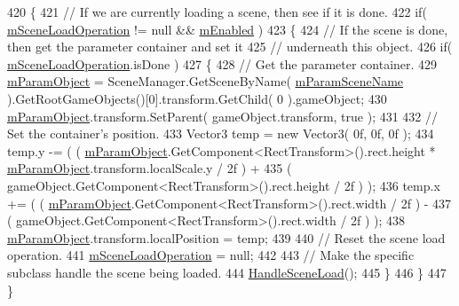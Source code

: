 \begin{DoxyCode}
420         \{
421             \textcolor{comment}{// If we are currently loading a scene, then see if it is done.}
422             \textcolor{keywordflow}{if}( \hyperlink{class_a_t_i_1_1_audio_effect_handler_a64e2617a1b7c1e6f4631a6aee98fbf3e}{mSceneLoadOperation} != null && \hyperlink{class_a_t_i_1_1_audio_effect_handler_a378c463b827ad6e41d09a4ec2caff351}{mEnabled} )
423             \{
424                 \textcolor{comment}{// If the scene is done, then get the parameter container and set it }
425                 \textcolor{comment}{// underneath this object.}
426                 \textcolor{keywordflow}{if}( \hyperlink{class_a_t_i_1_1_audio_effect_handler_a64e2617a1b7c1e6f4631a6aee98fbf3e}{mSceneLoadOperation}.isDone )
427                 \{
428                     \textcolor{comment}{// Get the parameter container.}
429                     \hyperlink{class_a_t_i_1_1_audio_effect_handler_a02ca13686cb3fc7bf152051ec881b0ed}{mParamObject} = SceneManager.GetSceneByName( 
      \hyperlink{class_a_t_i_1_1_audio_effect_handler_a674c38f29ef923e6c9487c2dc991a8b6}{mParamSceneName} ).GetRootGameObjects()[0].transform.GetChild( 0 ).gameObject;
430                     \hyperlink{class_a_t_i_1_1_audio_effect_handler_a02ca13686cb3fc7bf152051ec881b0ed}{mParamObject}.transform.SetParent( gameObject.transform, \textcolor{keyword}{true} );
431 
432                     \textcolor{comment}{// Set the container's position.}
433                     Vector3 temp = \textcolor{keyword}{new} Vector3( 0f, 0f, 0f );
434                     temp.y -= ( ( \hyperlink{class_a_t_i_1_1_audio_effect_handler_a02ca13686cb3fc7bf152051ec881b0ed}{mParamObject}.GetComponent<RectTransform>().rect.height * 
      \hyperlink{class_a_t_i_1_1_audio_effect_handler_a02ca13686cb3fc7bf152051ec881b0ed}{mParamObject}.transform.localScale.y / 2f ) +
435                         ( gameObject.GetComponent<RectTransform>().rect.height / 2f ) );
436                     temp.x += ( ( \hyperlink{class_a_t_i_1_1_audio_effect_handler_a02ca13686cb3fc7bf152051ec881b0ed}{mParamObject}.GetComponent<RectTransform>().rect.width / 2f ) 
      -
437                         ( gameObject.GetComponent<RectTransform>().rect.width / 2f ) );
438                     \hyperlink{class_a_t_i_1_1_audio_effect_handler_a02ca13686cb3fc7bf152051ec881b0ed}{mParamObject}.transform.localPosition = temp;
439 
440                     \textcolor{comment}{// Reset the scene load operation.}
441                     \hyperlink{class_a_t_i_1_1_audio_effect_handler_a64e2617a1b7c1e6f4631a6aee98fbf3e}{mSceneLoadOperation} = null;
442 
443                     \textcolor{comment}{// Make the specific subclass handle the scene being loaded.}
444                     \hyperlink{class_a_t_i_1_1_audio_effect_handler_aa038c62089df16a01d2749986649db11}{HandleSceneLoad}();
445                 \}
446             \}
447         \}
\end{DoxyCode}


